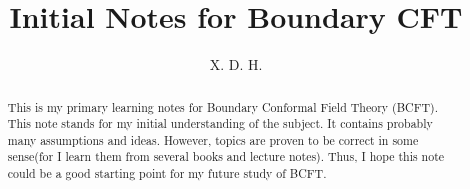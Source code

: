 \documentclass[11pt]{article}
\begin{document}
\title{\boldmath Initial Notes for Boundary CFT}
\author{X. D. H.}

\maketitle

\begin{abstract}
  This is my primary learning notes for Boundary Conformal Field
  Theory (BCFT). This note stands for my initial understanding of the
  subject. It contains probably many assumptions and ideas. However,
  topics are proven to be correct
  in some sense(for I learn them from several books and lecture
  notes). Thus, I hope this note could be a good starting point for
  my future study of BCFT.
\end{abstract}

\tableofcontents


\newpage

\end{document}
